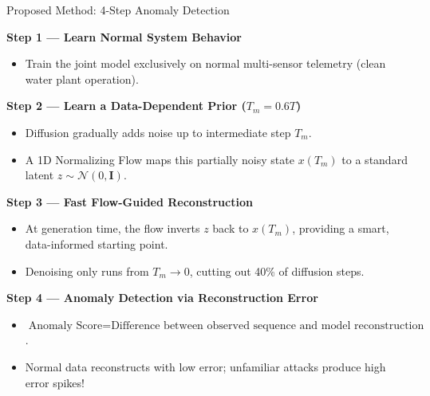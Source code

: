 \documentclass[aspectratio=169, 11pt]{beamer}
\begin{document}
\begin{frame}{Proposed Method: 4-Step Anomaly Detection}

  \textbf{\large Step 1 — Learn Normal System Behavior}
  \begin{itemize}
    \item Train the joint model exclusively on normal multi-sensor telemetry (clean water plant operation).
  \end{itemize}

  \vspace{5pt}
  \textbf{\large Step 2 — Learn a Data-Dependent Prior ($T_m = 0.6T$)}
  \begin{itemize}
    \item Diffusion gradually adds noise up to intermediate step $T_m$.
    \item A 1D Normalizing Flow maps this partially noisy state $x(T_m)$ to a standard latent $z \sim \mathcal{N}(0, \mathbf{I})$.
  \end{itemize}

  \vspace{5pt}
  \textbf{\large Step 3 — Fast Flow-Guided Reconstruction}
  \begin{itemize}
    \item At generation time, the flow inverts $z$ back to $x(T_m)$, providing a smart, data-informed starting point.
    \item Denoising only runs from $T_m \to 0$, cutting out 40\% of diffusion steps.
  \end{itemize}

  \vspace{5pt}
  \textbf{\large Step 4 — Anomaly Detection via Reconstruction Error}
  \begin{itemize}
    \item $\text{Anomaly Score} = \text{Difference between observed sequence and model reconstruction}$.
    \item Normal data reconstructs with low error; unfamiliar attacks produce high error spikes!
  \end{itemize}

\end{frame}
\end{document}
